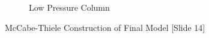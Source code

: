 \begin{figure}[ht]
\begin{subfigure}{0.49\textwidth}
            \caption{Low Pressure Column}
            \label{fig:LPC_v1}
        \end{subfigure}
        \caption{McCabe-Thiele Construction of Final Model [Slide 14]}
        \label{fig:mccabe_v1}
    \end{figure}
    
%